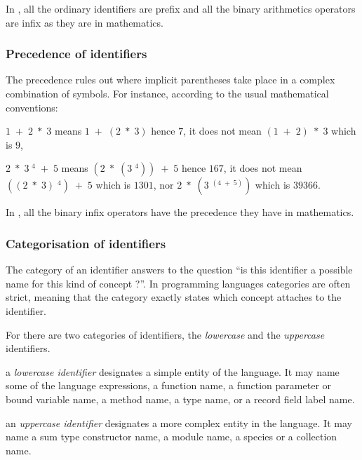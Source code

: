 In {\focal}, all the ordinary identifiers are prefix and all the binary
arithmetics operators are infix as they are in mathematics.

\subsubsection{Precedence of identifiers}

The precedence rules out where implicit parentheses take place in a
complex combination of symbols. For instance, according to the usual mathematical
conventions:
\begin{citemize}
\item $1\; +\; 2\; *\; 3$  means $1\; +\; (2\; *\; 3)$ hence $7$,
      it does not mean $(1\; +\; 2)\; *\; 3$ which is $9$,
\item $2\; *\; 3\; ^4\; +\; 5$ means
      $(2\; *\; (3\; ^4))\; +\; 5$ hence $167$, it does not mean
      $((2\; *\; 3)\; ^4)\; +\; 5$ which is $1301$,
      nor $2\; *\; (3\; ^{(4\; +\; 5)})$ which is $39366$.
\end{citemize}

In {\focal}, all the binary infix operators have the precedence they have in mathematics.

\subsubsection{Categorisation of identifiers}

The category of an identifier answers to the question ``is this identifier a
possible name for this kind of concept ?''.
In programming languages categories are often strict, meaning that the category
exactly states which concept attaches to the identifier.

For {\focal} there are two categories of identifiers, the {\em lowercase} and
the {\em uppercase} identifiers.

\begin{citemize}

\item a {\em lowercase identifier} designates a simple entity of the
  language. It may name some of the language expressions, a function name, a
  function parameter or bound variable name, a method name, a type name, or a
  record field label name.

\item an {\em uppercase identifier} designates a more complex entity in the
  language. It may name a sum type constructor name, a module name, a species
  or a collection name.

\end{citemize}

